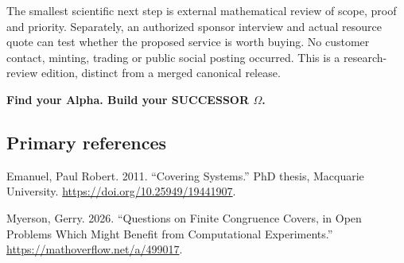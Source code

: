 \documentclass[11pt,a4paper]{article}
\newenvironment{CSLReferences}[2]{\begingroup\small\raggedright\setlength{\parskip}{0.5em}\setlength{\parindent}{0pt}}{\endgroup}
\begin{document}
The smallest scientific next step is external mathematical review of
scope, proof and priority. Separately, an authorized sponsor interview
and actual resource quote can test whether the proposed service is worth
buying. No customer contact, minting, trading or public social posting
occurred. This is a research-review edition, distinct from a merged
canonical release.

\textbf{Find your Alpha. Build your SUCCESSOR \(\Omega\).}


\hypertarget{primary-references}{%
\subsection{Primary references}\label{primary-references}}

\hypertarget{refs}{}
\begin{CSLReferences}{1}{0}
\leavevmode{}%
Emanuel, Paul Robert. 2011. {``Covering Systems.''} PhD thesis,
Macquarie University. \url{https://doi.org/10.25949/19441907}.

\leavevmode{}%
Myerson, Gerry. 2026. {``Questions on Finite Congruence Covers, in Open
Problems Which Might Benefit from Computational Experiments.''}
\url{https://mathoverflow.net/a/499017}.

\end{CSLReferences}
\end{document}
